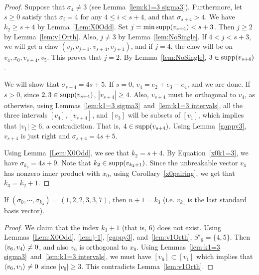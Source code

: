 \begin{proof}
Suppose that $\sigma_4\neq 3$ (see Lemma~\ref{lem:k1=3 sigma3}). Furthermore, let $s\ge 0$ satisfy that $\sigma_i=4$ for any $4\le i < s+4$, and that $\sigma_{s+4}>4$. We have $k_2\ge s+4$ by Lemma~\ref{Lem:X0Odd}.
 Set $j=\min \operatorname{supp}(v_{s+4})<s+3$. Then $j\ge2$ by Lemma~\ref{lem:v1Orth}.  Also, $j \ne 3$ by Lemma~\ref{lem:NoSingle}.
If $4<j<s+3$, we will get a claw $(v_j, v_{j-1}, v_{s+4}, v_{j+1})$, and if $j=4$, the claw will be on $v_4, x_0, v_{s+4}, v_5$. This proves that $j=2$. By Lemma~\ref{lem:NoSingle}, $3\in \operatorname{supp}(v_{s+4})$. 

We will show that $\sigma_{s+4}=4s+5$. If $s=0$, $v_4=e_2+e_3-e_4$, and we are done. If $s>0$, since $2,3\in\operatorname{supp}(v_{s+4})$,
$|v_{s+4}|\ge 4$. Also, $v_{s+4}$ must be orthogonal to $v_4$, as otherwise, using Lemmas~\ref{lem:k1=3 sigma3}~and~\ref{lem:k1=3 intervals}, all the three intervals $[v_4], [v_{s+4}]$, and $[v_3]$ will be subsets of $[v_1]$, which implies that $|v_1|\ge 6$, a contradiction. That is, $4\in \operatorname{supp}(v_{s+4})$. Using Lemma~\ref{gappy3}, $v_{s+4}$ is just right and $\sigma_{s+4}=4s+5$. 

Using Lemma~\ref{Lem:X0Odd}, we see that $k_2=s+4$. By Equation~\eqref{x0k1=3}, we have $\sigma_{k_3}=4s+9$. Note that $k_2\in \operatorname{supp}(v_{k_2+1})$. Since the unbreakable vector $v_4$ has nonzero inner product with $x_0$, using Corollary~\ref{x0pairing}, we get that $k_3=k_2+1$.  
\end{proof}

\begin{prop}\label{1k1=3}
If $(\sigma_0, \cdots, \sigma_{k_3})=(1,2,2,3,3,7)$, then $n+1=k_3$ (i.e. $v_{k_3}$ is the last standard basis vector).
\end{prop}
\begin{proof}
We claim that the index $k_3+1$ (that is, $6$) does not exist. Using Lemmas~\ref{Lem:X0Odd}, \ref{lem:j-1}, \ref{gappy3}, and~\ref{lem:v1Orth}, $S'_6=\{4, 5\}$. Then $\left\langle v_6 , v_4 \right\rangle\not = 0$, and also $v_6$ is orthogonal to $x_0$. Using Lemmas~\ref{lem:k1=3 sigma3}~and~\ref{lem:k1=3 intervals}, we must have $[v_6]\subset [v_1]$ which implies that $\left\langle v_6 , v_1 \right\rangle\ne 0$ since $|v_6|\ge 3$. This contradicts Lemma~\ref{lem:v1Orth}.
\end{proof}

